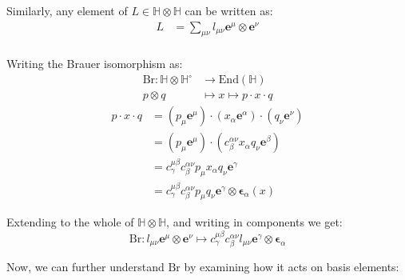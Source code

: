 \documentclass{amsart}
\providecommand{\HH}{\mathbb{H}}
\newcommand{\End}{\mathrm{End}}
\newcommand{\e}{\boldsymbol{e}}
\newcommand{\ep}{\boldsymbol{\epsilon}}
\newcommand{\1}{\boldsymbol{1}}
\begin{document}
Similarly, any element of $L \in \HH\otimes\HH$ can be written as:
\begin{align*}
  L &= \sum_{\mu\nu} l_{\mu\nu} \e^\mu \otimes \e^\nu \\
\end{align*}

Writing the Brauer isomorphism as:
\begin{align*}
  \mathrm{Br} : \HH\otimes\HH^\circ &\to \End(\HH) \\
      p \otimes q &\mapsto x \mapsto p\cdot x\cdot q
\end{align*}
\begin{align*}
  p\cdot x\cdot q &= (p_\mu\e^\mu)\cdot(x_\alpha\e^\alpha)\cdot(q_\nu\e^\nu)\\
  &= (p_\mu\e^\mu)\cdot(c^{\alpha\nu}_\beta x_\alpha q_\nu\e^\beta) \\
  &= c^{\mu\beta}_\gamma c^{\alpha\nu}_\beta p_\mu x_\alpha q_\nu\e^\gamma \\
  &= c^{\mu\beta}_\gamma c^{\alpha\nu}_\beta p_\mu q_\nu \e^\gamma\otimes\ep_\alpha (x)
\end{align*}

Extending to the whole of $\HH\otimes\HH$, and writing in components we get:
$$ \mathrm{Br} : l_{\mu\nu}\e^\mu\otimes\e^\nu \mapsto
                 c^{\mu\beta}_\gamma c^{\alpha\nu}_\beta l_{\mu\nu}
                 \e^\gamma\otimes\ep_\alpha $$


Now, we can further understand $\mathrm{Br}$ by examining how it acts on basis
elements:
\begin{align*}
  
\end{align*}
\end{document}
